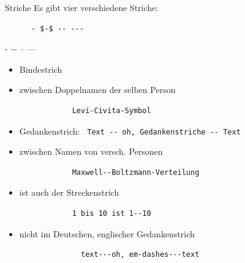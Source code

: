 \begin{frame}[fragile]{Striche}
  Es gibt vier verschiedene Striche:
  \begin{CodeExample}{0.49}
    \begin{lstlisting}
      - $-$ -- ---
    \end{lstlisting}
  \CodeResult
    - $-$ -- ---
  \end{CodeExample}

  \begin{description}
    \item[- Bindestrich]
      \begin{itemize}
        \item Bindestrich
        \item zwischen Doppelnamen der selben Person
          \begin{lstlisting}
            Levi-Civita-Symbol
          \end{lstlisting}
      \end{itemize}
    \item[-- Halbgeviertstrich (en-dash)]
      \begin{itemize}
        \item Gedankenstrich: \lstinline+ Text -- oh, Gedankenstriche -- Text +
        \item zwischen Namen von versch. Personen
          \smallskip
          \begin{lstlisting}
            Maxwell--Boltzmann-Verteilung
          \end{lstlisting}
          \smallskip
        \item ist auch der Streckenstrich
          \smallskip
          \begin{lstlisting}
            1 bis 10 ist 1--10
          \end{lstlisting}
          \smallskip
      \end{itemize}
    \item[--- Geviertstrich (em-dash)]
      \begin{itemize}
          \item nicht im Deutschen, englischer Gedankenstrich
            \begin{lstlisting}
              text---oh, em-dashes---text
            \end{lstlisting}
      \end{itemize}
  \end{description}
\end{frame}

